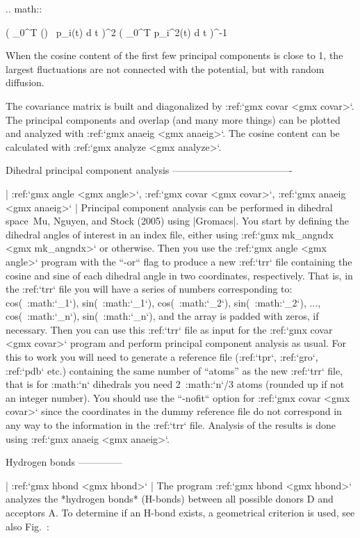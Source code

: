.. math::

   \left( \int_0^T \cos\left(\right) \, p_i(t) \mbox{d} t \right)^2
   \left( \int_0^T p_i^2(t) \mbox{d} t \right)^{-1}

When the cosine content of the first few principal components is close
to 1, the largest fluctuations are not connected with the potential, but
with random diffusion.

The covariance matrix is built and diagonalized by
:ref:`gmx covar <gmx covar>`. The principal components and
overlap (and many more things) can be plotted and analyzed with
:ref:`gmx anaeig <gmx anaeig>`. The cosine
content can be calculated with
:ref:`gmx analyze <gmx analyze>`.

Dihedral principal component analysis
-------------------------------------

| :ref:`gmx angle <gmx angle>`, :ref:`gmx covar <gmx covar>`, 
  :ref:`gmx anaeig <gmx anaeig>`
| Principal component analysis can be performed in dihedral space Mu,
  Nguyen, and Stock (2005) using |Gromacs|. You start by defining the
  dihedral angles of interest in an index file, either using
  :ref:`gmx mk_angndx <gmx mk_angndx>` or otherwise. Then you use the
  :ref:`gmx angle <gmx angle>` program with the ``-or`` flag to
  produce a new :ref:`trr` file containing the cosine and sine
  of each dihedral angle in two coordinates, respectively. That is, in
  the :ref:`trr` file you will have a series of numbers
  corresponding to: cos(\ :math:`\phi_1`), sin(\ :math:`\phi_1`),
  cos(\ :math:`\phi_2`), sin(\ :math:`\phi_2`), ...,
  cos(\ :math:`\phi_n`), sin(\ :math:`\phi_n`), and the array is padded
  with zeros, if necessary. Then you can use this :ref:`trr`
  file as input for the :ref:`gmx covar <gmx covar>` program and perform
  principal component analysis as usual. For this to work you will need
  to generate a reference file (:ref:`tpr`,
  :ref:`gro`, :ref:`pdb` etc.) containing the same
  number of “atoms” as the new :ref:`trr` file, that is for
  :math:`n` dihedrals you need 2\ :math:`n`/3 atoms (rounded up if not
  an integer number). You should use the ``-nofit`` option
  for :ref:`gmx covar <gmx covar>` since the coordinates in the dummy
  reference file do not correspond in any way to the information in the
  :ref:`trr` file. Analysis of the results is done using
  :ref:`gmx anaeig <gmx anaeig>`.

Hydrogen bonds
--------------

| :ref:`gmx hbond <gmx hbond>`
| The program :ref:`gmx hbond <gmx hbond>`
  analyzes the *hydrogen bonds* (H-bonds) between all possible donors D
  and acceptors A. To determine if an H-bond exists, a geometrical
  criterion is used, see also Fig. :

